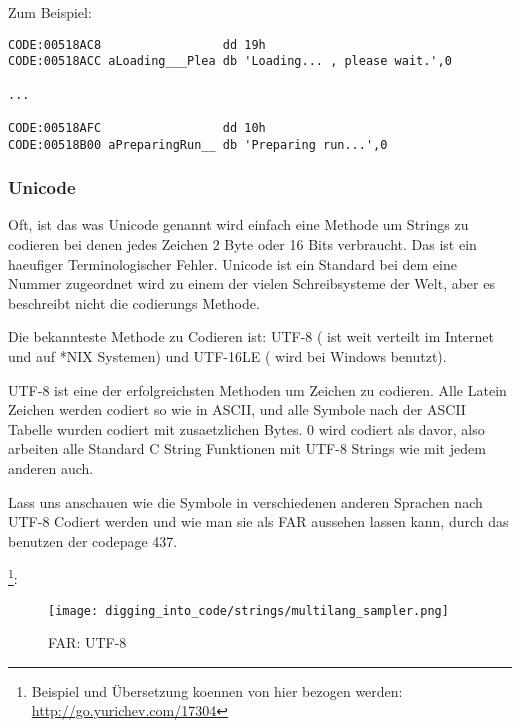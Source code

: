 Zum Beispiel:

\begin{lstlisting}[caption=Delphi,style=customasmx86]
CODE:00518AC8                 dd 19h
CODE:00518ACC aLoading___Plea db 'Loading... , please wait.',0

...

CODE:00518AFC                 dd 10h
CODE:00518B00 aPreparingRun__ db 'Preparing run...',0
\end{lstlisting}

\subsubsection{Unicode}


Oft, ist das was Unicode genannt wird einfach eine Methode um Strings zu codieren bei denen jedes Zeichen 2 Byte oder 
16 Bits verbraucht. Das ist ein haeufiger Terminologischer Fehler. Unicode ist ein Standard bei dem eine Nummer zugeordnet
wird zu einem der vielen Schreibsysteme der Welt, aber es beschreibt nicht die codierungs Methode. 


Die bekannteste Methode zu Codieren ist: UTF-8 ( ist weit verteilt im Internet und auf *NIX Systemen) und UTF-16LE ( wird bei Windows benutzt). 


UTF-8 ist eine der erfolgreichsten Methoden um Zeichen zu codieren.
Alle Latein Zeichen werden codiert so wie in ASCII, und alle Symbole nach der
ASCII Tabelle wurden codiert mit zusaetzlichen Bytes. 0 wird codiert als davor,
also arbeiten alle Standard C String Funktionen mit UTF-8 Strings wie mit jedem anderen auch.

Lass uns anschauen wie die Symbole in verschiedenen anderen Sprachen nach UTF-8 Codiert werden und 
wie man sie als FAR aussehen lassen kann, durch das benutzen der codepage 437.

\footnote{Beispiel und Übersetzung koennen von hier bezogen werden:  
\url{http://go.yurichev.com/17304}}:

\begin{figure}[H]
\centering
\texttt{[image: digging\_into\_code/strings/multilang\_sampler.png]}
\end{figure}

\begin{figure}[H]
\centering
{}
\caption{FAR: UTF-8}
\end{figure}

